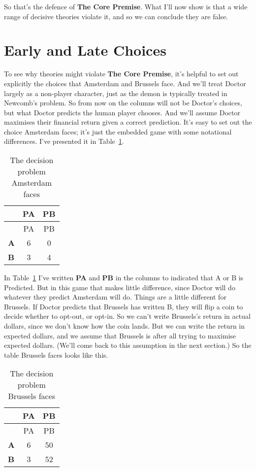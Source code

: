 \documentclass[
  11pt,
  letterpaper,
  DIV=11,
  numbers=noendperiod,
  twoside]{scrartcl}
\begin{document}
So that's the defence of \textbf{The Core Premise}. What I'll now show
is that a wide range of decisive theories violate it, and so we can
conclude they are false.

\section{Early and Late Choices}\label{early-and-late-choices}

To see why theories might violate \textbf{The Core Premise}, it's
helpful to set out explicitly the choices that Amsterdam and Brussels
face. And we'll treat Doctor largely as a non-player character, just as
the demon is typically treated in Newcomb's problem. So from now on the
columns will not be Doctor's choices, but what Doctor predicts the human
player chooses. And we'll assume Doctor maximises their financial return
given a correct prediction. It's easy to set out the choice Amsterdam
faces; it's just the embedded game with some notational differences.
I've presented it in Table~\ref{tbl-main-game-ams}.

\begin{longtable}[]{@{}lcc@{}}
\caption{The decision problem Amsterdam
faces}\label{tbl-main-game-ams}\tabularnewline
\toprule\noalign{}
& PA & PB \\
\midrule\noalign{}
\endfirsthead
\toprule\noalign{}
& PA & PB \\
\midrule\noalign{}
\endhead
\bottomrule\noalign{}
\endlastfoot
\textbf{A} & 6 & 0 \\
\textbf{B} & 3 & 4 \\
\end{longtable}

In Table~\ref{tbl-main-game-ams} I've written \textbf{PA} and
\textbf{PB} in the columns to indicated that A or B is Predicted. But in
this game that makes little difference, since Doctor will do whatever
they predict Amsterdam will do. Things are a little different for
Brussels. If Doctor predicts that Brussels has written B, they will flip
a coin to decide whether to opt-out, or opt-in. So we can't write
Brussels's return in actual dollars, since we don't know how the coin
lands. But we can write the return in expected dollars, and we assume
that Brussels is after all trying to maximise expected dollars. (We'll
come back to this assumption in the next section.) So the table Brussels
faces looks like this.

\begin{longtable}[]{@{}lcc@{}}
\caption{The decision problem Brussels
faces}\label{tbl-main-game-bru}\tabularnewline
\toprule\noalign{}
& PA & PB \\
\midrule\noalign{}
\endfirsthead
\toprule\noalign{}
& PA & PB \\
\midrule\noalign{}
\endhead
\bottomrule\noalign{}
\endlastfoot
\textbf{A} & 6 & 50 \\
\textbf{B} & 3 & 52 \\
\end{longtable}
\end{document}
